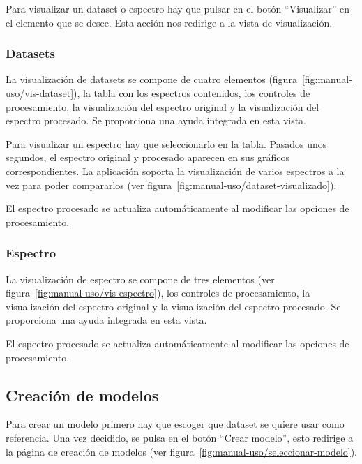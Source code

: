 Para visualizar un dataset o espectro hay que pulsar en el botón ``Visualizar'' 
en el elemento que se desee. Esta acción nos redirige a la vista de 
visualización.

\subsubsection{Datasets}

La visualización de datasets se compone de cuatro elementos 
(figura~\ref{fig:manual-uso/vis-dataset}), la tabla con los espectros 
contenidos, los controles de procesamiento, la visualización del 
espectro original y la visualización del espectro procesado. Se proporciona una 
ayuda integrada en esta vista.


Para visualizar un espectro hay que seleccionarlo en la tabla. Pasados unos 
segundos, el espectro original y procesado aparecen en sus gráficos 
correspondientes. La aplicación soporta la visualización de varios espectros a 
la vez para poder compararlos (ver 
figura~\ref{fig:manual-uso/dataset-visualizado}).


El espectro procesado se actualiza automáticamente al modificar las opciones de 
procesamiento.

\subsubsection{Espectro}

La visualización de espectro se compone de tres elementos  (ver 
figura~\ref{fig:manual-uso/vis-espectro}), los controles de procesamiento, la 
visualización del espectro original y la visualización del espectro procesado. 
Se proporciona una ayuda integrada en esta vista.


El espectro procesado se actualiza automáticamente al modificar las opciones de 
procesamiento.

\subsection{Creación de modelos}

Para crear un modelo primero hay que escoger que dataset se quiere usar como 
referencia. Una vez decidido, se pulsa en el botón ``Crear modelo'', esto 
redirige a la página de creación de modelos (ver 
figura~\ref{fig:manual-uso/seleccionar-modelo}). 

